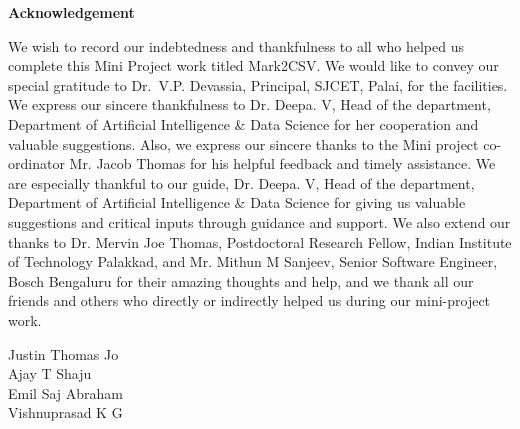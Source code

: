 \thispagestyle{empty}
\begin{center}
  \vspace*{1cm}
  \textbf{\large Acknowledgement}
\end{center}
We wish to record our indebtedness and thankfulness to all who helped us complete this Mini Project work titled Mark2CSV. We would like to convey our special gratitude to Dr.~V.P. Devassia, Principal, SJCET, Palai, for the facilities. We express our sincere thankfulness to Dr. Deepa. V, Head of the department, Department of Artificial Intelligence \& Data Science for her cooperation and valuable suggestions. Also, we express our sincere thanks to the Mini project co-ordinator Mr. Jacob Thomas for his helpful feedback and timely assistance.
We are especially thankful to our guide, Dr. Deepa. V, Head of the department, Department of Artificial Intelligence \& Data Science for giving us valuable suggestions and critical inputs through guidance and support. We also extend our thanks to Dr. Mervin Joe Thomas, Postdoctoral Research Fellow, Indian Institute of Technology Palakkad, and Mr. Mithun M Sanjeev, Senior Software Engineer, Bosch Bengaluru for their amazing thoughts and help, and we thank all our friends and others who directly or indirectly helped us during our mini-project work.
 \\
\begin{flushright}
Justin Thomas Jo \\   
Ajay T Shaju \\
Emil Saj Abraham \\
Vishnuprasad K G
\end{flushright}


\newpage

